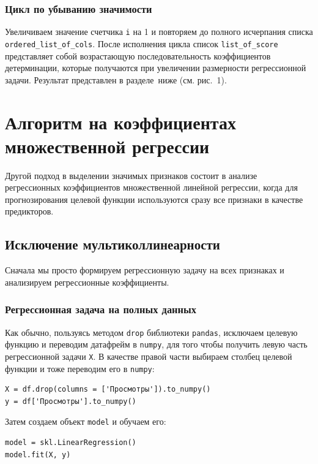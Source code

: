 \documentclass[a4paper,12pt]{article}
\begin{document}
\subsubsection{Цикл по убыванию значимости}

Увеличиваем значение счетчика \texttt{i} на 1 и повторяем до полного исчерпания списка \texttt{ordered\_list\_of\_cols}. После исполнения цикла список \texttt{list\_of\_score} представляет собой возрастающую последовательность коэффициентов детерминации, которые получаются при увеличении размерности регрессионной задачи. Результат представлен в разделе ниже (см. рис. 1).



\section{Алгоритм на коэффициентах\\ множественной регрессии}

Другой подход в выделении значимых признаков состоит в анализе регрессионных коэффициентов множественной линейной регрессии, когда для прогнозирования целевой функции используются сразу все признаки в качестве предикторов.


\subsection{Исключение мультиколлинеарности}

Сначала мы просто формируем регрессионную задачу на всех признаках и анализируем регрессионные коэффициенты.

\subsubsection{Регрессионная задача на полных данных}

Как обычно, пользуясь методом \texttt{drop} библиотеки \texttt{pandas}, исключаем целевую функцию и переводим датафрейм в \texttt{numpy}, для того чтобы получить левую часть регрессионной задачи \texttt{X}. В качестве правой части выбираем столбец целевой функции и тоже переводим его в \texttt{numpy}:
\begin{verbatim}
X = df.drop(columns = ['Просмотры']).to_numpy()
y = df['Просмотры'].to_numpy()
\end{verbatim}
Затем создаем объект \texttt{model} и обучаем его: 
\begin{verbatim}
model = skl.LinearRegression()
model.fit(X, y)
\end{verbatim}
\end{document}
